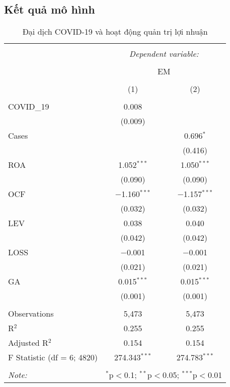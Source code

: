 \documentclass[a4paper]{article}
\begin{document}
\subsection{Kết quả mô hình}
\begin{table}[!htbp] \centering 
  \caption{Đại dịch COVID-19 và hoạt động quản trị lợi nhuận} 
  \label{tb6} 
\begin{tabular}{@{\extracolsep{5pt}}lcc} 
\\[-1.8ex]\hline 
\hline \\[-1.8ex] 
 & \multicolumn{2}{c}{\textit{Dependent variable:}} \\ 
\cline{2-3} 
\\[-3ex] & \multicolumn{2}{c}{EM} \\ 
\\[-3ex] & (1) & (2)\\ 
\hline \\[-1.8ex] 
 COVID\_19 & 0.008 &  \\ 
  & (0.009) &  \\ 
 Cases &  & 0.696$^{*}$ \\ 
  &  & (0.416) \\ 
 ROA & 1.052$^{***}$ & 1.050$^{***}$ \\ 
  & (0.090) & (0.090) \\ 
 OCF & $-$1.160$^{***}$ & $-$1.157$^{***}$ \\ 
  & (0.032) & (0.032) \\ 
 LEV & 0.038 & 0.040 \\ 
  & (0.042) & (0.042) \\ 
 LOSS & $-$0.001 & $-$0.001 \\ 
  & (0.021) & (0.021) \\ 
 GA & 0.015$^{***}$ & 0.015$^{***}$ \\ 
  & (0.001) & (0.001) \\ 
\hline \\[-1.8ex] 
Observations & 5,473 & 5,473 \\ 
R$^{2}$ & 0.255 & 0.255 \\ 
Adjusted R$^{2}$ & 0.154 & 0.154 \\ 
F Statistic (df = 6; 4820) & 274.343$^{***}$ & 274.783$^{***}$ \\ 
\hline 
\hline \\[-1.8ex] 
\textit{Note:}  & \multicolumn{2}{r}{$^{*}$p$<$0.1; $^{**}$p$<$0.05; $^{***}$p$<$0.01} \\ 
\end{tabular} 
\end{table} 
\end{document}
